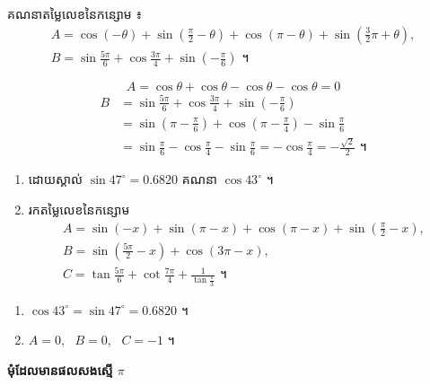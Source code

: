 \begin{example}[លំហាត់គំរូ ៨]
គណនាតម្លៃលេខនៃកន្សោម ៖
\[
\begin{gathered}
A = \cos(-\theta) + \sin\left(\frac{\pi}{2} - \theta\right) + \cos(\pi - \theta) + \sin\left(\frac{3}{2}\pi + \theta\right),\\
B = \sin\frac{5\pi}{6} + \cos\frac{3\pi}{4} + \sin\left(-\frac{\pi}{6}\right) \text{ ។}
\end{gathered}
\]
\end{example}
\ans
\[ A = \cos\theta + \cos\theta - \cos\theta - \cos\theta = 0 \]
\[
\begin{aligned}
B &= \sin\frac{5\pi}{6} + \cos\frac{3\pi}{4} + \sin\left(-\frac{\pi}{6}\right)\\
&= \sin\left(\pi - \frac{\pi}{6}\right) + \cos\left(\pi - \frac{\pi}{4}\right) - \sin\frac{\pi}{6}\\
&= \sin\frac{\pi}{6} - \cos\frac{\pi}{4} - \sin\frac{\pi}{6} = -\cos\frac{\pi}{4} = -\frac{\sqrt{2}}{2} \text{ ។}
\end{aligned}
\]

\begin{pro}
\begin{enumerate}[1]
  \item ដោយស្គាល់ $\sin 47^\circ = 0.6820$ គណនា $\cos 43^\circ$ ។
  \item រកតម្លៃលេខនៃកន្សោម
  \[
\begin{gathered}
A = \sin(-x) + \sin(\pi - x) + \cos(\pi - x) + \sin\left(\frac{\pi}{2} - x\right),\\
B = \sin\left(\frac{5\pi}{2} - x\right) + \cos(3\pi - x),\\
C = \tan\frac{5\pi}{6} + \cot\frac{7\pi}{4} + \frac{1}{\tan\frac{\pi}{3}} \text{ ។}
\end{gathered}
\]
\end{enumerate}
\ans
\begin{enumerate}[1]
  \item $\cos 43^\circ = \sin 47^\circ = 0.6820$ ។
  \item $A = 0$, \ $B = 0$, \ $C = -1$ ។
\end{enumerate}
\end{pro}

\textbf{មុំដែលមានផលសងស្មើ $\pi$}


